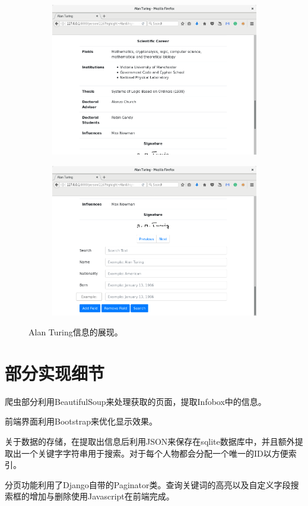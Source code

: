 \documentclass[11pt,a4paper]{article}
\begin{document}
\begin{figure}[H]
\begin{subfigure}{.49\textwidth}
		\includegraphics[width=\linewidth]{turing-3.png}
	\end{subfigure}
	\hfill
	\begin{subfigure}{.49\textwidth}
		\centering
		\includegraphics[width=\linewidth]{turing-4.png}
	\end{subfigure}
	\caption{Alan Turing信息的展现。}
\end{figure}

\section{部分实现细节}
爬虫部分利用BeautifulSoup来处理获取的页面，提取Infobox中的信息。

前端界面利用Bootstrap来优化显示效果。

关于数据的存储，在提取出信息后利用JSON来保存在sqlite数据库中，并且额外提取出一个关键字字符串用于搜索。对于每个人物都会分配一个唯一的ID以方便索引。

分页功能利用了Django自带的Paginator类。查询关键词的高亮以及自定义字段搜索框的增加与删除使用Javascript在前端完成。
\end{document}
